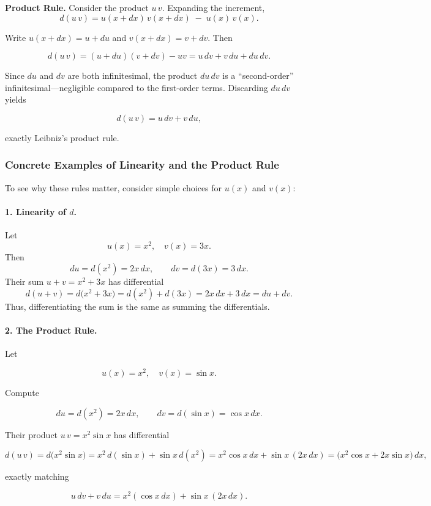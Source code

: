 \textbf{Product Rule.}  Consider the product \(u\,v\).  Expanding the increment,
\[
d(u\,v)
= u(x+dx)\,v(x+dx) \;-\; u(x)\,v(x).
\]

Write \(u(x+dx)=u+du\) and \(v(x+dx)=v+dv\).  Then

\[
d(u\,v)
= (u + du)(v + dv) - u v
= u\,dv + v\,du + du\,dv.
\]

Since \(du\) and \(dv\) are both infinitesimal, the product \(du\, dv\) is a “second-order” 
infinitesimal—negligible compared to the first-order terms.  Discarding \(du\, dv\) yields

\[
d(u\,v) = u\,dv + v\,du,
\]

exactly Leibniz’s product rule.



\subsubsection*{Concrete Examples of Linearity and the Product Rule}

To see why these rules matter, consider simple choices for \(u(x)\) and \(v(x)\):

\paragraph{1. Linearity of \(d\).}  
Let
\[
u(x) = x^2,
\quad
v(x) = 3x.
\]
Then
\[
du = d(x^2) = 2x\,dx,
\qquad
dv = d(3x) = 3\,dx.
\]
Their sum \(u+v = x^2 + 3x\) has differential
\[
d(u+v)
= d\bigl(x^2 + 3x\bigr)
= d(x^2) + d(3x)
= 2x\,dx + 3\,dx
= du + dv.
\]
Thus, differentiating the sum is the same as summing the differentials.

\paragraph{2. The Product Rule.}  

Let

\[
u(x) = x^2,
\quad
v(x) = \sin x.
\]

Compute

\[
du = d(x^2) = 2x\,dx,
\qquad
dv = d(\sin x) = \cos x\,dx.
\]

Their product \(u\,v = x^2\sin x\) has differential

\[
d(u\,v)
= d\bigl(x^2 \sin x\bigr)
= x^2\,d(\sin x) + \sin x\,d(x^2)
= x^2\cos x\,dx + \sin x\,(2x\,dx)
= \bigl(x^2\cos x + 2x\sin x\bigr)\,dx,
\]

exactly matching

\[
u\,dv + v\,du
= x^2(\cos x\,dx) + \sin x\,(2x\,dx).
\]

